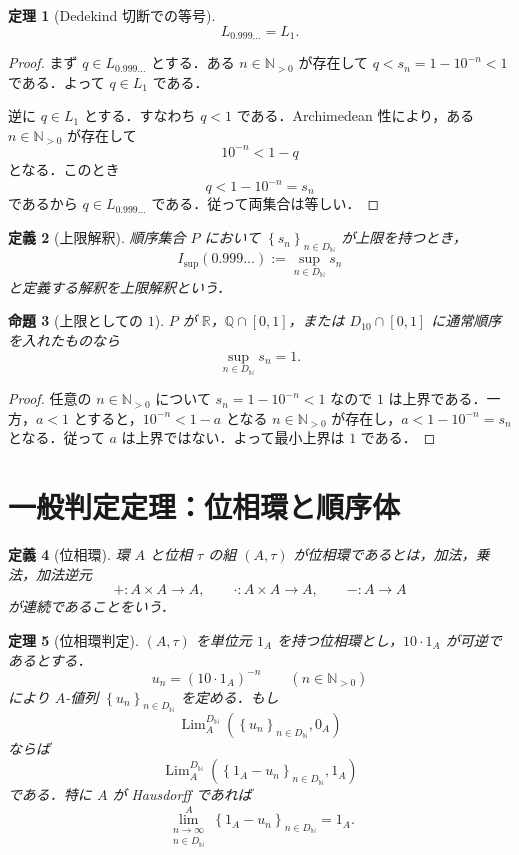 \documentclass[a4paper,11pt]{ltjsarticle}
\theoremstyle{jpdef}
\newtheorem{definition}{定義}[section]
\theoremstyle{jpthm}
\newtheorem{theorem}[definition]{定理}
\newtheorem{proposition}[definition]{命題}
\newcommand{\N}{\mathbb{N}}
\newcommand{\Q}{\mathbb{Q}}
\newcommand{\R}{\mathbb{R}}
\newcommand{\Lim}{\operatorname{Lim}}
\newcommand{\Ns}{\N_{>0}}
\newcommand{\DN}{D_{\N}}
\newcommand{\seq}[2]{\left\{#1\right\}_{#2}}
\begin{document}
\begin{theorem}[Dedekind 切断での等号]
\[
  L_{0.999\ldots}=L_1.
\]
\end{theorem}

\begin{proof}
まず \(q\in L_{0.999\ldots}\) とする．ある \(n\in\Ns\) が存在して \(q<s_n=1-10^{-n}<1\) である．よって \(q\in L_1\) である．

逆に \(q\in L_1\) とする．すなわち \(q<1\) である．Archimedean 性により，ある \(n\in\Ns\) が存在して
\[
  10^{-n}<1-q
\]
となる．このとき
\[
  q<1-10^{-n}=s_n
\]
であるから \(q\in L_{0.999\ldots}\) である．従って両集合は等しい．
\end{proof}

\begin{definition}[上限解釈]
順序集合 \(P\) において \(\seq{s_n}{n\in\DN}\) が上限を持つとき，
\[
  I_{\sup}(0.999\ldots):=\sup_{n\in\DN}s_n
\]
と定義する解釈を上限解釈という．
\end{definition}

\begin{proposition}[上限としての \(1\)]
\(P\) が \(\R\)，\(\Q\cap[0,1]\)，または \(D_{10}\cap[0,1]\) に通常順序を入れたものなら
\[
  \sup_{n\in\DN}s_n=1.
\]
\end{proposition}

\begin{proof}
任意の \(n\in\Ns\) について \(s_n=1-10^{-n}<1\) なので \(1\) は上界である．一方，\(a<1\) とすると，\(10^{-n}<1-a\) となる \(n\in\Ns\) が存在し，\(a<1-10^{-n}=s_n\) となる．従って \(a\) は上界ではない．よって最小上界は \(1\) である．
\end{proof}

\section{一般判定定理：位相環と順序体}

\begin{definition}[位相環]
環 \(A\) と位相 \(\tau\) の組 \((A,\tau)\) が位相環であるとは，加法，乗法，加法逆元
\[
  +:A\times A\to A,
  \qquad
  \cdot:A\times A\to A,
  \qquad
  -:A\to A
\]
が連続であることをいう．
\end{definition}

\begin{theorem}[位相環判定]
\((A,\tau)\) を単位元 \(1_A\) を持つ位相環とし，\(10\cdot1_A\) が可逆であるとする．
\[
  u_n=(10\cdot1_A)^{-n}\qquad(n\in\Ns)
\]
により \(A\)-値列 \(\seq{u_n}{n\in\DN}\) を定める．もし
\[
  \Lim_A^{\DN}(\seq{u_n}{n\in\DN},0_A)
\]
ならば
\[
  \Lim_A^{\DN}(\seq{1_A-u_n}{n\in\DN},1_A)
\]
である．特に \(A\) が Hausdorff であれば
\[
  \lim_{\substack{n\to\infty\\ n\in\DN}}^{A}\seq{1_A-u_n}{n\in\DN}=1_A.
\]
\end{theorem}
\end{document}
